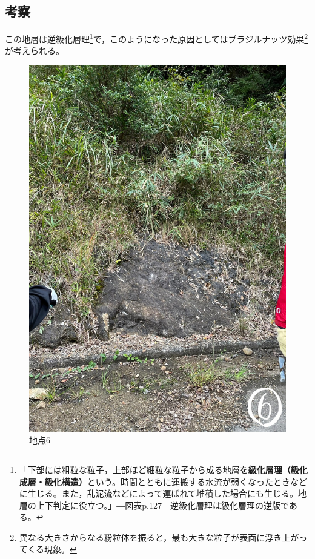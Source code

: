 \documentclass[uplatex,b5paper]{jsreport}
\begin{document}
    \subsection{考察}
    この地層は逆級化層理\footnote{「下部には粗粒な粒子，上部ほど細粒な粒子から成る地層を\textbf{級化層理（級化成層・級化構造）}という。時間とともに運搬する水流が弱くなったときなどに生じる。また，乱泥流などによって運ばれて堆積した場合にも生じる。地層の上下判定に役立つ。」―図表p.127　逆級化層理は級化層理の逆版である。}で，このようになった原因としてはブラジルナッツ効果\footnote{異なる大きさからなる粉粒体を振ると，最も大きな粒子が表面に浮き上がってくる現象。}が考えられる。
  \begin{figure}[h]
    \begin{center}
      \includegraphics[scale=0.06]{files/地学実習/地点6.jpg}
      \caption{地点6}
    \end{center}
  \end{figure}
  \clearpage
\end{document}
